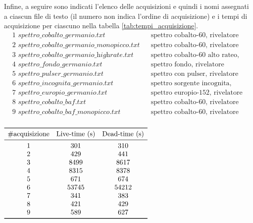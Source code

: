 \documentclass{article}
\begin{document}
        Infine, a seguire sono indicati l'elenco delle acquisizioni e quindi i nomi assegnati a ciascun file di testo (il numero non indica l'ordine di acquisizione) e i tempi di acquisizione per ciascuno nella tabella \ref{tab:tempi_acquisizione}.
        \begin{align*}
            &1 \textit{ spettro\_cobalto\_germanio.txt}&&\text{spettro cobalto-60, rivelatore germanio}\\
            &2 \textit{ spettro\_cobalto\_germanio\_monopicco.txt}&&\text{spettro cobalto-60, rivelatore germanio (soglia)}\\
            &3 \textit{ spettro\_cobalto\_germanio\_highrate.txt}&&\text{spettro cobalto-60 alto rateo, rivelatore germanio}\\
            &4 \textit{ spettro\_fondo\_germanio.txt}&&\text{spettro fondo, rivelatore germanio}\\
            &5 \textit{ spettro\_pulser\_germanio.txt}&&\text{spettro con pulser, rivelatore germanio}\\
            &6 \textit{ spettro\_incognita\_germanio.txt}&&\text{spettro sorgente incognita, rivelatore germanio}\\
            &7 \textit{ spettro\_europio\_germanio.txt}&&\text{spettro europio-152, rivelatore germanio}\\
            &8 \textit{ spettro\_cobalto\_baf.txt}&&\text{spettro cobalto-60, rivelatore fluoruro di bario}\\
            &9 \textit{ spettro\_cobalto\_baf\_monopicco.txt}&&\text{spettro cobalto-60, rivelatore fluoruro di bario (soglia)}\\
        \end{align*}

        \begin{table}[h!]
                \centering
                \caption{Tempi di acquisizione}
                \label{tab:tempi_acquisizione}
                $
                \begin{array}{ccc}
                    \toprule
                    \text{\#acquisizione}&\text{Live-time (\si{\second})}&\text{Dead-time (\si{\second})}\\
                    \midrule
                    1&301&310\\
                    2&429&441\\
                    3&8499&8617\\
                    4&8315&8378\\
                    5&671&674\\
                    6&53745&54212\\
                    7&341&383\\
                    8&421&429\\
                    9&589&627\\
                    \bottomrule
                \end{array}
                $
            \end{table}
\end{document}
